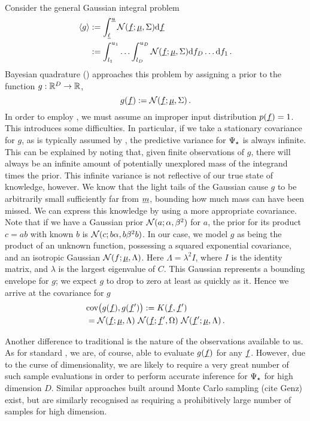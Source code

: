 \documentclass[twoside]{article}
\begin{document}
Consider the general Gaussian integral problem
\begin{align}\label{eq:GI}
\langle g \rangle & := \int_{\underline{\smash{\ell}}}^{\underline{\smash{u}}} \mathcal{N}(\underline{\smash{f}};\underline{\smash{\mu}},\Sigma) \mathrm{d} \underline{\smash{f}}\nonumber\\
& := \int_{l_1}^{u_1}\ldots\int_{l_D}^{u_D} \mathcal{N}(\underline{\smash{f}};\underline{\smash{\mu}},\Sigma) \mathrm{d} f_D \ldots \mathrm{d} f_1\,.
\end{align}
Bayesian quadrature () approaches this problem by assigning a \gp prior to the function $g: \mathbb{R}^D \to \mathbb{R}$,
\begin{equation}
 g(\underline{\smash{f}}) := \mathcal{N}(\underline{\smash{f}};\underline{\smash{\mu}},\Sigma)\,.
\end{equation}
In order to employ , we must assume an improper input distribution $p(\underline{\smash{f}}) = 1$. This introduces some difficulties. In particular, if we take a stationary covariance for $g$, as is typically assumed by , the predictive variance for $\Psi_\star$ is always infinite. This can be explained by noting that, given finite observations of $g$, there will always be an infinite amount of potentially unexplored mass of the integrand times the prior. This infinite variance is not reflective of our true state of knowledge, however. We know that the light tails of the Gaussian cause $g$ to be arbitrarily small sufficiently far from $\underline{\smash{m}}$, bounding how much mass can have been missed. We can express this knowledge by using a more appropriate covariance. Note that if we have a Gaussian prior $\mathcal{N}(a;\alpha,\beta^2)$ for $a$, the prior for its product $c = a b$ with known $b$ is $\mathcal{N}(c;b \alpha,b \beta^2 b)$. In our case, we model $g$ as being the product of an unknown function, possessing a squared 
exponential covariance, and an isotropic Gaussian $\mathcal{N}(f;\underline{\smash{\mu}},\Lambda)$. Here $\Lambda = \lambda^2 I$, where $I$ is the identity matrix, and $\lambda$ is the largest eigenvalue of $C$. This Gaussian represents a bounding envelope for $g$; we expect $g$ to drop to zero at least as quickly as it. Hence we arrive at the covariance for $g$
\begin{align}
 & \text{cov}\bigl(g(\underline{\smash{f}}), g(\underline{\smash{f}}')\bigr) := K(\underline{\smash{f}}, \underline{\smash{f}}')\nonumber\\ & = \mathcal{N}(\underline{\smash{f}};\underline{\smash{\mu}},\Lambda)~\mathcal{N}(\underline{\smash{f}};\underline{\smash{f}}',\Omega)~\mathcal{N}(\underline{\smash{f}}';\underline{\smash{\mu}},\Lambda)\,.
\end{align}

Another difference to traditional  is the nature of the observations available to us. As for standard , we are, of course, able to evaluate $g(\underline{\smash{f}})$ for any $\underline{\smash{f}}$. However, due to the curse of dimensionality, we are likely to require a very great number of such sample evaluations in order to perform accurate inference for $\Psi_\star$ for high dimension $D$. Similar approaches built around Monte Carlo sampling (cite Genz) exist, but are similarly recognised as requiring a prohibitively large number of samples for high dimension. 
\end{document}
